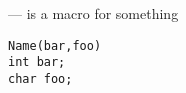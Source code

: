 \startmanpage
{}
--- is a macro for something 
\startvb\begin{verbatim}
Name(bar,foo)
int bar;
char foo;
\end{verbatim}
\endvb

\endmanpage
